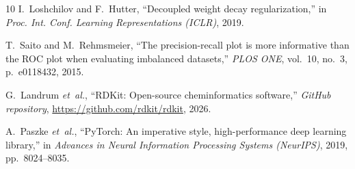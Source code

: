 \documentclass[conference]{IEEEtran}
\begin{document}
\begin{thebibliography}{10}
I.~Loshchilov and F.~Hutter,
``Decoupled weight decay regularization,''
in \emph{Proc. Int. Conf. Learning Representations (ICLR)}, 2019.

T.~Saito and M.~Rehmsmeier,
``The precision-recall plot is more informative than the ROC plot when evaluating imbalanced datasets,''
\emph{PLOS ONE}, vol.~10, no.~3, p.~e0118432, 2015.

G.~Landrum \emph{et~al.},
``RDKit: Open-source cheminformatics software,''
\emph{GitHub repository}, \url{https://github.com/rdkit/rdkit}, 2026.

A.~Paszke \emph{et~al.},
``PyTorch: An imperative style, high-performance deep learning library,''
in \emph{Advances in Neural Information Processing Systems (NeurIPS)}, 2019, pp.~8024--8035.

\end{thebibliography}
\end{document}
